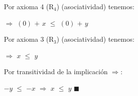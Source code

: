 \documentclass[12pt]{article}
\renewcommand{\qedsymbol}{$\blacksquare$}
\begin{document}
{\textcolor{carrotorange}{Por axioma 4 (R$_4$) }} {({\textcolor{pakistangreen}{asociatividad}})} tenemos: \vspace{0.5cm}


\hspace{3.8cm} $\Longrightarrow$ $(0)$ $+$ $x$ $\leq$ $(0)$  $+$ $y$ 
\vspace{0.5cm}   

{\textcolor{carrotorange}{Por axioma 3 (R$_3$) }} {({\textcolor{pakistangreen}{asociatividad}})} tenemos: \vspace{0.5cm}


\hspace{3.8cm} $\Longrightarrow$ $x$ $\leq$  $y$ 
\vspace{0.5cm}  

{\textcolor{carrotorange}{Por transitividad de la  {\textcolor{pakistangreen}{implicación}}}} {\textcolor{vividviolet}{{\Large{$\Longrightarrow$}}}}:  \vspace{0.5cm} 

\hspace{1.6cm} $-y$ $\leq$ $-x$ $\Longrightarrow$ $x$ $\leq$  $y$ \hspace{0.5cm} \qedsymbol
\vspace{0.5cm} 
\end{document}
